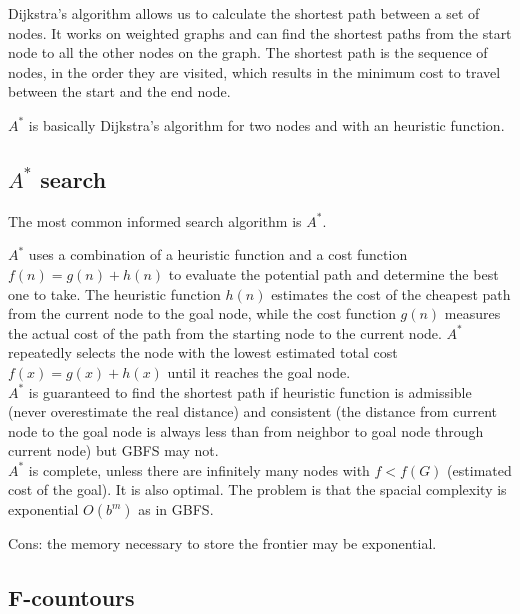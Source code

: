 \documentclass{article}
\begin{document}
Dijkstra's algorithm allows us to calculate the shortest path between a set of nodes. It works on weighted graphs and can find the shortest paths from the start node to all the other nodes on the graph. The shortest path is the sequence of nodes, in the order they are visited, which results in the minimum cost to travel between the start and the end node. \\

\begin{flushleft}
    $A^*$ is basically Dijkstra's algorithm for two nodes and with an heuristic function.
\end{flushleft}

\subsection{$A^*$ search}

The most common informed search algorithm is $A^*$.

$A^*$ uses a combination of a heuristic function and a cost function $f(n) = g(n) + h(n)$ to evaluate the potential path and determine the best one to take. The heuristic function $h(n)$ estimates the cost of the cheapest path from the current node to the goal node, while the cost function $g(n)$ measures the actual cost of the path from the starting node to the current node. $A^*$ repeatedly selects the node with the lowest estimated total cost $f(x) = g(x) + h(x)$ until it reaches the goal node. \\

$A^*$ is guaranteed to find the shortest path if heuristic function is admissible (never overestimate the real distance) and consistent (the distance from current node to the goal node is always less than from neighbor to goal node through current node) but GBFS may not. \\

$A^*$ is complete, unless there are infinitely many nodes with $f < f(G)$ (estimated cost of the goal).
It is also optimal. The problem is that the spacial complexity is exponential $O(b^m)$ as in GBFS. \\




\begin{flushleft}
    Cons: the memory necessary to store the frontier may be exponential.
\end{flushleft}

\newpage

\subsection{F-countours}
\end{document}
